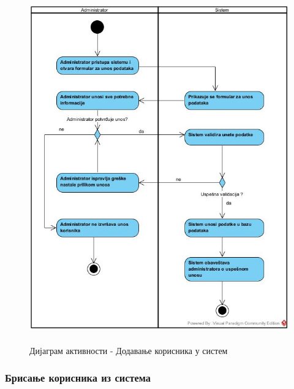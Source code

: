 \documentclass{article}
\begin{document}
\begin{figure}[H]
    \centering
    \includegraphics[width=1.1\textwidth, height=15cm]{Dijagrami_slike/dodavanje_korisnika.jpg}
    \caption{Дијаграм активности - Додавање корисника у систем}
\end{figure}

\subsubsection{Брисање корисника из система}
\end{document}
